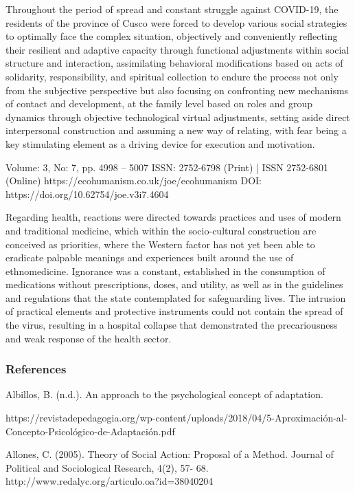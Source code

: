 \documentclass{article}
\begin{document}
Throughout the period of spread and constant struggle against COVID-19, the residents of the province of Cusco were forced to develop various social strategies to optimally face the complex situation, objectively and conveniently reflecting their resilient and adaptive capacity through functional adjustments within social structure and interaction, assimilating behavioral modifications based on acts of solidarity, responsibility, and spiritual collection to endure the process not only from the subjective perspective but also focusing on confronting new mechanisms of contact and development, at the family level based on roles and group dynamics through objective technological virtual adjustments, setting aside direct interpersonal construction and assuming a new way of relating, with fear being a key stimulating element as a driving device for execution and motivation.

Volume: 3, No: 7, pp. 4998 – 5007 ISSN: 2752-6798 (Print) | ISSN 2752-6801 (Online) https://ecohumanism.co.uk/joe/ecohumanism DOI: https://doi.org/10.62754/joe.v3i7.4604

Regarding health, reactions were directed towards practices and uses of modern and traditional medicine, which within the socio-cultural construction are conceived as priorities, where the Western factor has not yet been able to eradicate palpable meanings and experiences built around the use of ethnomedicine. Ignorance was a constant, established in the consumption of medications without prescriptions, doses, and utility, as well as in the guidelines and regulations that the state contemplated for safeguarding lives. The intrusion of practical elements and protective instruments could not contain the spread of the virus, resulting in a hospital collapse that demonstrated the precariousness and weak response of the health sector.

\subsubsection{\textbf{References}}

Albillos, B. (n.d.). An approach to the psychological concept of adaptation.

https://revistadepedagogia.org/wp-content/uploads/2018/04/5-Aproximación-al-Concepto-Psicológico-de-Adaptación.pdf

Allones, C. (2005). Theory of Social Action: Proposal of a Method. Journal of Political and Sociological Research, 4(2), 57- 68. http://www.redalyc.org/articulo.oa?id=38040204
\end{document}
